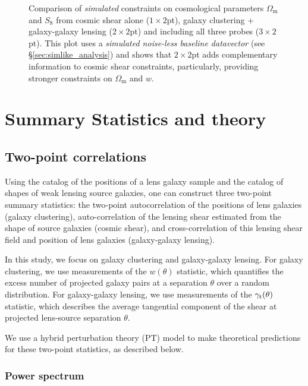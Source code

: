 \documentclass[aps, prd,twocolumn,superscriptaddress,nofootinbib,preprintnumbers]{revtex4-1}
\newcommand{\jdr}[1]{{\color{blue}[JDR: #1]}}
\begin{document}
\begin{figure}
\caption[]{Comparison of \textit{simulated} constraints on cosmological parameters $\Omega_{\mathrm{m}}$ and $S_8$ from cosmic shear alone ($1\times2$pt), galaxy clustering + galaxy-galaxy lensing ($2\times2$pt) and including all three probes ($3\times2$pt). This plot uses a \textit{simulated noise-less baseline datavector} (see \S\ref{sec:simlike_analysis}) and shows that $2\times2$pt adds complementary information to cosmic shear constraints, particularly, providing stronger constraints on $\Omega_{\mathrm{m}}$ and $w$.}
\label{fig:all2pt_comp}
\end{figure}


\section{Summary Statistics and theory}
\label{sec:stat_theory}
\subsection{Two-point correlations}
Using the catalog of the positions of a lens galaxy sample and the catalog of shapes of weak lensing source galaxies, one can construct three two-point summary statistics: the two-point autocorrelation of the positions of lens galaxies (galaxy clustering), auto-correlation of the lensing shear estimated from the shape of source galaxies (cosmic shear), and cross-correlation of this lensing shear field and position of lens galaxies (galaxy-galaxy lensing). 

In this study, we focus on galaxy clustering and galaxy-galaxy lensing. For galaxy clustering, we use measurements of the $w(\theta)$ statistic, which quantifies the excess number of projected galaxy pairs at a separation $\theta$ over a random distribution. For galaxy-galaxy lensing, we use measurements of the $\gamma_{\rm t}(\theta)$ statistic, which describes the average tangential component of the shear at projected lens-source separation $\theta$. 

We use a hybrid perturbation theory (PT) model to make theoretical predictions for these two-point statistics, as described below. 

\subsubsection{Power spectrum}
\label{sec:Pk_pred}
\end{document}
